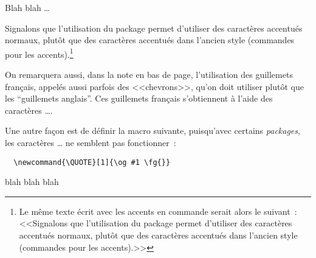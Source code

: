 \begin{introduction}



\label{introduction.chap}

Blah blah \ldots

Signalons que l'utilisation du package  permet d'utiliser
des caractères accentués normaux, plutôt que des caractères accentués
dans l'ancien style (commandes pour les accents).\footnote{Le même
texte écrit avec les accents en commande serait alors le suivant~:
<<Signalons que l'utilisation du package  permet
d'utiliser des caract\`eres accentu\'es normaux, plut\^ot que des
caract\`eres accentu\'es dans l'ancien style (commandes pour les
accents).>>}

On remarquera aussi, dans la note en bas de page, l'utilisation des
guillemets français, appelés aussi parfois des <<chevrons>>, qu'on
doit utiliser plutôt que les ``guillemets anglais''.  Ces guillemets
français s'obtiennent à l'aide des caractères
\TT{<}\TT{<}\ldots\TT{>}\TT{>}.

Une autre façon est de définir la macro suivante, puisqu'avec certains
\emph{packages}, les caract\`eres \TT{<}\TT{<}\ldots\TT{>}\TT{>} ne
semblent pas fonctionner~:
{\small
\begin{verbatim}
  \newcommand{\QUOTE}[1]{\og #1 \fg{}}
\end{verbatim}
} 


\newpage

blah blah blah

\end{introduction}

